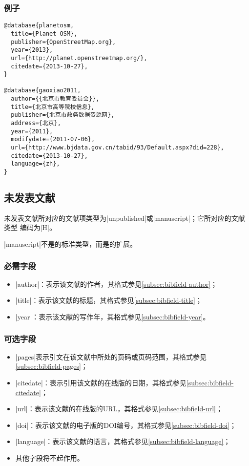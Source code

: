 \subsubsection{例子}

\begin{verbatim}
@database{planetosm,
  title={Planet OSM},
  publisher={OpenStreetMap.org},
  year={2013},
  url={http://planet.openstreetmap.org/},
  citedate={2013-10-27},  
}

@database{gaoxiao2011,
  author={{北京市教育委员会}},
  title={北京市高等院校信息},
  publisher={北京市政务数据资源网},
  address={北京},
  year={2011},
  modifydate={2011-07-06},
  url={http://www.bjdata.gov.cn/tabid/93/Default.aspx?did=228},
  citedate={2013-10-27},
  language={zh},
}
\end{verbatim}

\subsection{未发表文献}\label{subsec:bibtype-unpublished}

未发表文献所对应的{\BibTeX}文献项类型为|unpublished|或|manuscript|；它所对应的文献类型
编码为|H|\cite{gbt3469-1983}。

|manuscript|不是{\BibTeX}的标准类型，而是{\njuthesis}的扩展。

\subsubsection{必需字段}

\begin{itemize}
\item |author|：表示该文献的作者，其格式参见\ref{subsec:bibfield-author}；
\item |title|：表示该文献的标题，其格式参见\ref{subsec:bibfield-title}；
\item |year|：表示该文献的写作年，其格式参见\ref{subsec:bibfield-year}。
\end{itemize}

\subsubsection{可选字段}

\begin{itemize}
\item |pages|表示引文在该文献中所处的页码或页码范围，其格式参见\ref{subsec:bibfield-pages}；  
\item |citedate|：表示引用该文献的在线版的日期，其格式参见\ref{subsec:bibfield-citedate}；
\item |url|：表示该文献的在线版的URL，其格式参见\ref{subsec:bibfield-url}；
\item |doi|：表示该文献的电子版的DOI编号，其格式参见\ref{subsec:bibfield-doi}；
\item |language|：表示该文献的语言，其格式参见\ref{subsec:bibfield-language}；
\item 其他字段将不起作用。
\end{itemize}

